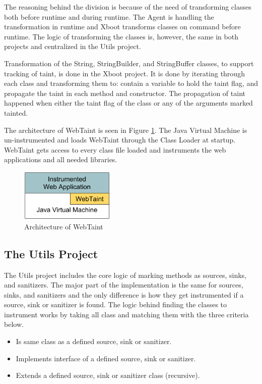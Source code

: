 The reasoning behind the division is because of the need of transforming classes both before runtime and during runtime. The Agent is handling the transformation in runtime and Xboot transforms classes on command before runtime. The logic of transforming the classes is, however, the same in both projects and centralized in the Utils project.

Transformation of the String, StringBuilder, and StringBuffer classes, to support tracking of taint, is done in the Xboot project. It is done by iterating through each class and transforming them to: contain a variable to hold the taint flag, and propagate the taint in each method and constructor. The propagation of taint happened when either the taint flag of the class or any of the arguments marked tainted.

The architecture of WebTaint is seen in Figure \ref{fig:WebTaint}. The Java Virtual Machine is un-instrumented and loads WebTaint through the Class Loader at startup. WebTaint gets access to every class file loaded and instruments the web applications and all needed libraries.

\begin{figure}[H]
    \centering
    \includegraphics[width=0.4\textwidth]{images/WebTaintArchitecture.png}
    \caption{Architecture of WebTaint}
    \label{fig:WebTaint}
\end{figure}



\subsection{The Utils Project}
The Utils project includes the core logic of marking methods as sources, sinks, and sanitizers. The major part of the implementation is the same for sources, sinks, and sanitizers and the only difference is how they get instrumented if a source, sink or sanitizer is found. The logic behind finding the classes to instrument works by taking all class and matching them with the three criteria below.

\hfill
\begin{itemize}
    \item Is same class as a defined source, sink or sanitizer.
    \item Implements interface of a defined source, sink or sanitizer.
    \item Extends a defined source, sink or sanitizer class (recursive).
\end{itemize}
\hfill

